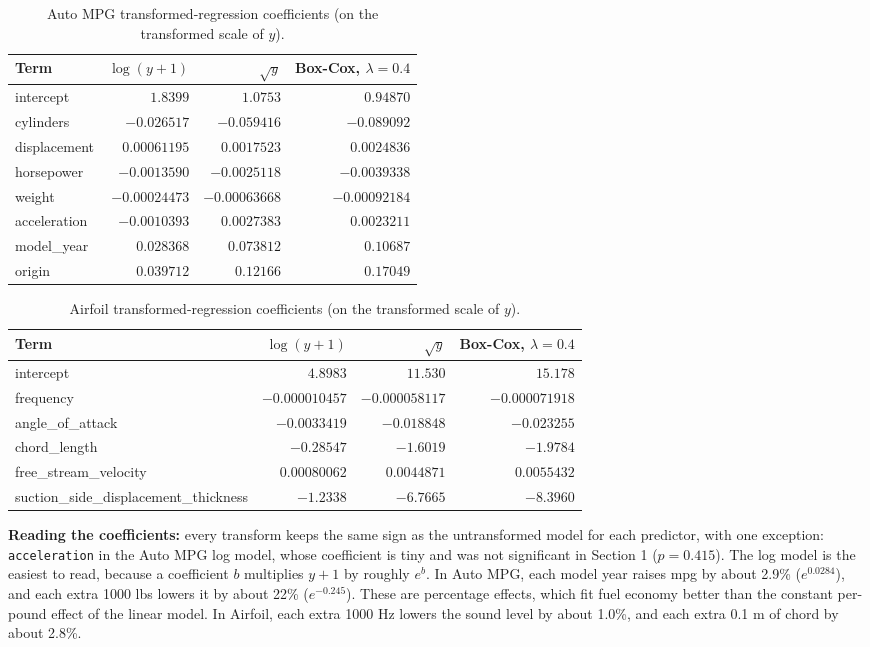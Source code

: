 \documentclass[11pt]{article}
\begin{document}
\begin{table}[H]
\centering
\caption{Auto MPG transformed-regression coefficients (on the transformed
scale of $y$).}
\begin{tabular}{lrrr}
\toprule
Term & $\log(y+1)$ & $\sqrt{y}$ & Box-Cox, $\lambda=0.4$ \\
\midrule
intercept & $1.8399$ & $1.0753$ & $0.94870$ \\
cylinders & $-0.026517$ & $-0.059416$ & $-0.089092$ \\
displacement & $0.00061195$ & $0.0017523$ & $0.0024836$ \\
horsepower & $-0.0013590$ & $-0.0025118$ & $-0.0039338$ \\
weight & $-0.00024473$ & $-0.00063668$ & $-0.00092184$ \\
acceleration & $-0.0010393$ & $0.0027383$ & $0.0023211$ \\
model\_year & $0.028368$ & $0.073812$ & $0.10687$ \\
origin & $0.039712$ & $0.12166$ & $0.17049$ \\
\bottomrule
\end{tabular}
\end{table}

\begin{table}[H]
\centering
\caption{Airfoil transformed-regression coefficients (on the transformed
scale of $y$).}
\begin{tabular}{lrrr}
\toprule
Term & $\log(y+1)$ & $\sqrt{y}$ & Box-Cox, $\lambda=0.4$ \\
\midrule
intercept & $4.8983$ & $11.530$ & $15.178$ \\
frequency & $-0.000010457$ & $-0.000058117$ & $-0.000071918$ \\
angle\_of\_attack & $-0.0033419$ & $-0.018848$ & $-0.023255$ \\
chord\_length & $-0.28547$ & $-1.6019$ & $-1.9784$ \\
free\_stream\_velocity & $0.00080062$ & $0.0044871$ & $0.0055432$ \\
suction\_side\_displacement\_thickness & $-1.2338$ & $-6.7665$ & $-8.3960$ \\
\bottomrule
\end{tabular}
\end{table}

\textbf{Reading the coefficients:} every transform keeps the same sign as the
untransformed model for each predictor, with one exception:
\texttt{acceleration} in the Auto MPG log model, whose coefficient is tiny
and was not significant in Section 1 ($p=0.415$). The log model is the
easiest to read, because a coefficient $b$ multiplies $y+1$ by roughly
$e^{b}$. In Auto MPG, each model year raises mpg by about 2.9\%
($e^{0.0284}$), and each extra 1000 lbs lowers it by about 22\%
($e^{-0.245}$). These are percentage effects, which fit fuel economy better
than the constant per-pound effect of the linear model. In Airfoil, each
extra 1000 Hz lowers the sound level by about 1.0\%, and each extra 0.1 m of
chord by about 2.8\%.
\end{document}
